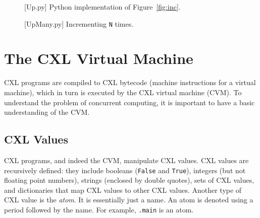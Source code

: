 \documentclass{report}
\newenvironment{code}{
\tcolorbox
}{
\endtcolorbox
}
\begin{document}
\begin{figure}
\begin{code}
\end{code}
\caption{[Up.py] Python implementation of Figure~\ref{fig:inc}.}
\label{fig:incpy}
\end{figure}

\begin{figure}
\begin{code}
\end{code}
\caption{[UpMany.py] Incrementing \texttt{N} times.}
\label{fig:incmany}
\end{figure}

\chapter{The CXL Virtual Machine}
\label{ch:cxlmachine}

CXL programs are compiled to CXL bytecode
(machine instructions for a virtual machine),
which in turn is executed by the CXL virtual machine (CVM).
To understand the problem of concurrent computing, it
is important to have a basic understanding of the CVM.

\section*{CXL Values}
\label{ap:cxlvalues}

CXL programs, and indeed the CVM,  manipulate CXL values.
CXL values are recursively defined:
they include booleans (\texttt{False} and \texttt{True}),
integers (but not floating point numbers),
strings (enclosed by double quotes),
sets of CXL values,
and dictionaries
that map CXL values to other CXL values.
%
Another type of CXL value is the \emph{atom}.
It is essentially
just a name.  An atom is denoted using a period followed by the
name.  For example, \texttt{.main} is an atom.
\end{document}
